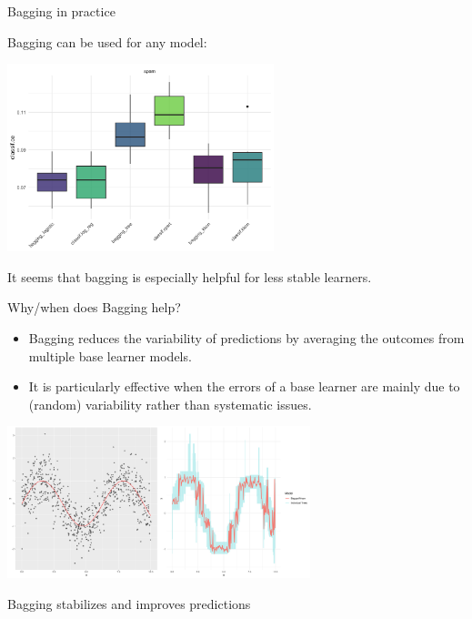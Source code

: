 \documentclass[11pt,compress,t,notes=noshow, xcolor=table]{beamer}
\begin{document}
\begin{vbframe}{Bagging in practice}

Bagging can be used for any model:

\vspace{2em}

\includegraphics[width=220pt]{figure/bagging-bench.png}

\vspace{1em}

It seems that bagging is especially helpful for less stable learners.

\end{vbframe}


\begin{vbframe}{Why/when does Bagging help?}

\begin{itemize}
  \item Bagging reduces the variability of predictions by averaging the outcomes from multiple base learner models.

  \item It is particularly effective when the errors of a base learner are mainly due to (random) variability rather than systematic issues.
\end{itemize}

\begin{center}
\includegraphics[width=250pt]{figure/bagging-mean.png}
\end{center}

\begin{center}
\footnotesize{Bagging stabilizes and improves predictions}
\end{center}

\end{vbframe}
\end{document}
